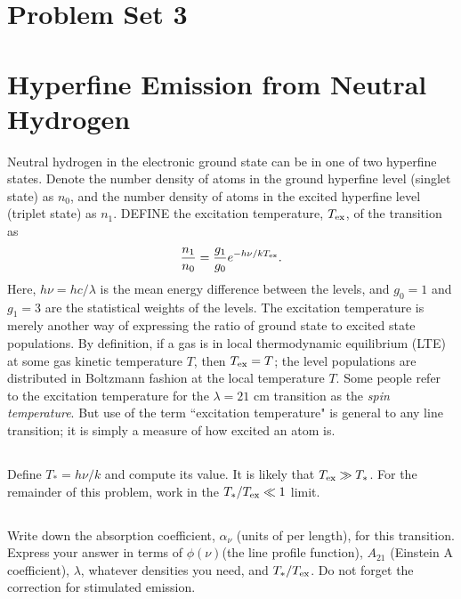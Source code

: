 \documentclass[11pt]{article}
\begin{document}
\pagestyle{empty}
\parindent=0pt

\section*{\centering Problem Set 3}


\def\Tex{{T_{\rm ex}}}
\section{Hyperfine Emission from Neutral Hydrogen}
\vspace{-8pt}

Neutral hydrogen in the electronic ground state can be in one of two hyperfine
states. Denote the number density of atoms in the ground hyperfine level
(singlet state) as $n_0$, and the number density of atoms in the excited hyperfine
level (triplet state) as $n_1$. DEFINE the excitation temperature, $\Tex$, of the
transition as
\begin{equation}
\frac{n_1}{n_0}=\frac{g_1}{g_0}e^{-h\nu/k\Tex}.
\end{equation}
Here, $h\nu=hc/\lambda$ is the mean energy difference between the levels, and
$g_0=1$ and $g_1=3$ are the statistical weights of the levels. The excitation
temperature is merely another way of expressing the ratio of ground state to
excited state populations. By definition, if a gas is in local thermodynamic
equilibrium (LTE) at some gas kinetic temperature $T$, then $\Tex = T$; the level
populations are distributed in Boltzmann fashion at the local temperature $T$.
Some people refer to the excitation temperature for the $\lambda = 21$ cm transition as
the {\it spin temperature}. But use of the term ``excitation temperature" is general
to any line transition; it is simply a measure of how excited an atom is.

\def\Ts{{T_*}}
\subsection{}
\vspace{-8pt}
Define $\Ts=h\nu/k$ and compute its value.
It is likely that $\Tex\gg\Ts$. For the remainder of this problem, work in the $\Ts/\Tex\ll1$
limit.

\subsection{}
\vspace{-8pt}
Write down the absorption coefficient, $\alpha_\nu$ (units of per length), for
this transition. Express your answer in terms of $\phi(\nu)$(the line profile
function), $A_{21}$ (Einstein A coefficient), $\lambda$, whatever densities you need, and
$\Ts/\Tex$. Do not forget the correction for stimulated emission.
\end{document}
